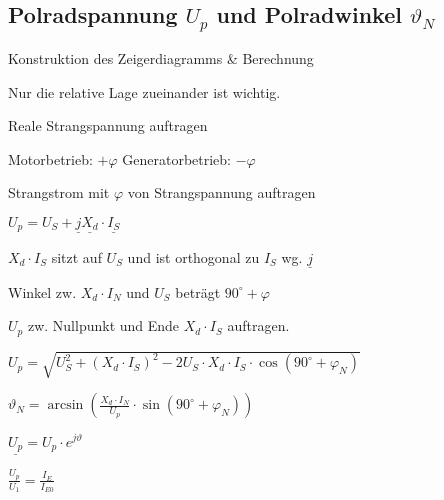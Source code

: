 \documentclass[german]{latex4ei/latex4ei_sheet}
\begin{document}
	\begin{sectionbox}
		\subsection{Polradspannung $U_p$ und Polradwinkel $\vartheta_N$}
			\begin{cookbox}{Konstruktion des Zeigerdiagramms \& Berechnung}
				\item Nur die relative Lage zueinander ist wichtig.
				\item Reale Strangspannung auftragen
				\item Motorbetrieb: $+\varphi$ \quad Generatorbetrieb: $-\varphi$  
				\item Strangstrom mit $\varphi$ von Strangspannung auftragen
				\item $U_p = U_S + \underline{j} \underline{X_d}\cdot \underline{I_S}$
				\item $X_d \cdot I_S$ sitzt auf $U_S$ und ist orthogonal zu $I_S$ wg. $\underline{j}$
				\item Winkel zw. $X_d \cdot I_N$ und $U_S$ beträgt $90^\circ + \varphi$
				\item $U_p$ zw. Nullpunkt und Ende $X_d \cdot I_S$ auftragen.
				\item $U_p =\sqrt{U_S^2+(X_d\cdot I_S)^2-2U_S\cdot X_d \cdot I_S \cdot \cos(90^\circ+\varphi_N)}$
				\item $\vartheta_N = \arcsin\left(\frac{X_d\cdot I_N}{U_p}\cdot \sin(90^\circ + \varphi_N)\right)$
				\item $\underline{U_p} = U_p \cdot e^{j\vartheta}$
			\end{cookbox}
			$\frac{U_p}{U_1} = \frac{I_E}{I_{E0}}$
	\end{sectionbox}
		\vspace{5cm} %
\end{document}
